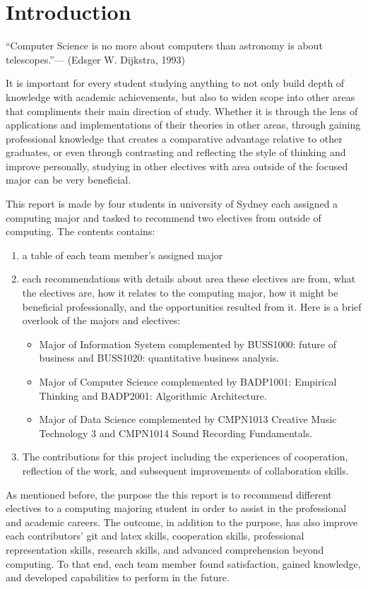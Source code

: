 \documentclass{article}
\begin{document}
\section{Introduction}
	\begin{displayquote}
	“Computer Science is no more about computers than astronomy is about telescopes.”— (Edsger W. Dijkstra, 1993)
	\end{displayquote}
	It is important for every student studying anything to not only build depth of knowledge with academic achievements, but also to widen scope into other areas that compliments their main direction of study. Whether it is through the 	lens of applications and implementations of their theories in other areas, through gaining professional knowledge that creates a comparative advantage relative to other graduates, or even through contrasting and reflecting the style of thinking and improve personally, studying in other electives with area outside of the focused major can be very beneficial.\par
	This report is made by four students in university of Sydney each assigned a computing major and tasked to recommend two electives from outside of computing. The contents contains:
	\begin{enumerate}
		\item a table of each team member’s assigned major
		\item each recommendations with details about area these electives are from, what the electives are, how it relates to the computing major, how it might be beneficial professionally, and the opportunities resulted from it. Here is a brief overlook of the majors and electives:
		\begin{itemize}
			\item Major of Information System complemented by BUSS1000: future of business and BUSS1020: quantitative business analysis.
			\item Major of Computer Science complemented by BADP1001: Empirical Thinking and BADP2001: Algorithmic Architecture.
			\item Major of Data Science complemented by CMPN1013 Creative Music Technology 3 and CMPN1014 Sound Recording Fundamentals.
		\end{itemize}
		\item The contributions for this project including the experiences of cooperation, reflection of the work, and subsequent improvements of collaboration skills.
	\end{enumerate}
	As mentioned before, the purpose the this report is to recommend different electives to a computing majoring student in order to assist in the professional and academic careers. The outcome, in addition to the purpose, has also improve each contributors’ git and latex skills, cooperation skills, professional representation skills, research skills, and  advanced comprehension beyond computing. To that end, each team member found satisfaction, gained knowledge, and developed capabilities to perform in the future.
\end{document}
